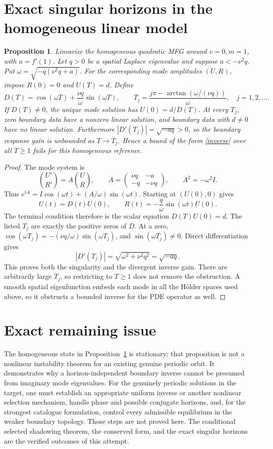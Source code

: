 \documentclass[11pt]{article}
\newtheorem{proposition}[theorem]{Proposition}
\begin{document}
\section{Exact singular horizons in the homogeneous linear model}
\begin{proposition}\label{resonant}
Linearize the homogeneous quadratic MFG around $v=0,m=1$, with
$a=f'(1)$. Let $q>0$ be a spatial Laplace eigenvalue and suppose
$a<-\nu^2q$. Put $\omega=\sqrt{-q(\nu^2q+a)}$.
For the corresponding mode amplitudes $(U,R)$, impose $R(0)=0$ and
$U(T)=d$. Define
\[
 D(T)=\cos(\omega T)+\frac{\nu q}{\omega}\sin(\omega T),\qquad
 T_j=\frac{j\pi-\arctan(\omega/(\nu q))}{\omega},\quad j=1,2,\ldots.
\]
If $D(T)\ne0$, the unique mode solution has $U(0)=d/D(T)$.
At every $T_j$, zero boundary data have a nonzero linear solution,
and boundary data with $d\ne0$ have no linear solution.
Furthermore $|D'(T_j)|=\sqrt{-aq}>0$, so the boundary response gain
is unbounded as $T\to T_j$. Hence a bound of the form
\eqref{inverse} over all $T\geq1$ fails for this homogeneous reference.
\end{proposition}
\begin{proof}
The mode system is
\[
 \binom{U'}{R'}=
 A\binom U R,\qquad
 A=\begin{pmatrix}\nu q&-a\\-q&-\nu q\end{pmatrix},
 \qquad A^2=-\omega^2 I.
\]
Thus $e^{tA}=I\cos(\omega t)+(A/\omega)\sin(\omega t)$.
Starting at $(U(0),0)$ gives
\[
 U(t)=D(t)U(0),\qquad R(t)=-\frac q\omega\sin(\omega t)U(0).
\]
The terminal condition therefore is the scalar equation $D(T)U(0)=d$.
The listed $T_j$ are exactly the positive zeros of $D$.
At a zero, $\cos(\omega T_j)=-(\nu q/\omega)\sin(\omega T_j)$,
and $\sin(\omega T_j)\ne0$. Direct differentiation gives
\[
 |D'(T_j)|=\sqrt{\omega^2+\nu^2q^2}=\sqrt{-aq}.
\]
This proves both the singularity and the divergent inverse gain.
There are arbitrarily large $T_j$, so restricting to $T\geq1$ does
not remove the obstruction. A smooth spatial eigenfunction embeds each
mode in all the H\"older spaces used above, so it obstructs a bounded
inverse for the PDE operator as well.
\end{proof}

\section{Exact remaining issue}
The homogeneous state in Proposition~\ref{resonant} is stationary;
that proposition is not a nonlinear instability theorem for an existing
genuine periodic orbit. It demonstrates why a horizon-independent
boundary inverse cannot be presumed from imaginary mode eigenvalues.
For the genuinely periodic solutions in the target, one must establish an
appropriate uniform inverse or another nonlinear selection mechanism,
handle phase and possible conjugate horizons, and, for the strongest
catalogue formulation, control every admissible equilibrium in the weaker
boundary topology. Those steps are not proved here. The conditional
selected shadowing theorem, the conserved form, and the exact singular
horizons are the verified outcomes of this attempt.
\end{document}
